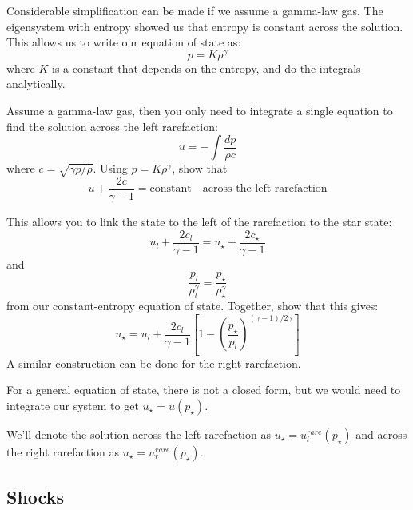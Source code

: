 Considerable simplification can be made if we assume a gamma-law gas.
The eigensystem with entropy showed us that entropy is constant across
the solution.  This allows us to write our equation of state as:
\begin{equation}
p = K \rho^\gamma
\end{equation}
where $K$ is a constant that depends on the entropy, and do the 
integrals analytically.

\begin{exercise}
Assume a gamma-law gas, then you only need to integrate a single
equation to find the solution across the left rarefaction:
\begin{equation}
u = - \int \frac{dp}{\rho c}
\end{equation}
where $c = \sqrt{\gamma p/\rho}$.  Using $p = K\rho^\gamma$, show that
\begin{equation}
u + \frac{2c}{\gamma - 1} = \mbox{constant} \quad \mbox{across the left rarefaction}
\end{equation}

This allows you to link the state to the left of the rarefaction to the star state:
\begin{equation}
u_l + \frac{2c_l}{\gamma - 1} = u_\star + \frac{2c_\star}{\gamma -1}
\end{equation}
and
\begin{equation}
\frac{p_l}{\rho_l^\gamma} = \frac{p_\star}{\rho_\star^\gamma}
\end{equation}
from our constant-entropy equation of state.  Together, show that this
gives:
\begin{equation}
u_\star = u_l + \frac{2c_l}{\gamma - 1} \left [ 1 - \left ( \frac{p_\star}{p_l}\right )^{(\gamma - 1)/2\gamma} \right ]
\end{equation}
A similar construction can be done for the right rarefaction.
\end{exercise}

For a general equation of state, there is not a closed form, but we would need
to integrate our system to get $u_\star = u(p_\star)$.

We'll denote the solution across the left rarefaction as $u_\star =
u_l^{rare}(p_\star)$ and across the right rarefaction as $u_\star =
u_r^{rare}(p_\star)$.

\subsection{Shocks}

